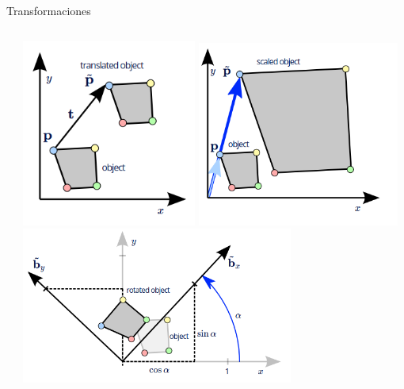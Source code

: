 \documentclass[aspectratio=169,compress]{beamer}
\begin{document}
\begin{frame}{Transformaciones}
\begin{columns}
\begin{column}{0.5\textwidth}
\begin{itemize}
\end{itemize}
\end{column}
\begin{column}{0.5\textwidth}
\begin{center}
 \includegraphics[width=0.45\textwidth]{FigsOpenGL/Traslacion}
     \includegraphics[width=0.52\textwidth]{FigsOpenGL/Escalamiento}\\
  \includegraphics[width=0.7\textwidth]{FigsOpenGL/Rotacion}

 \end{center}
\end{column}
\end{columns}

\end{frame}
\end{document}

